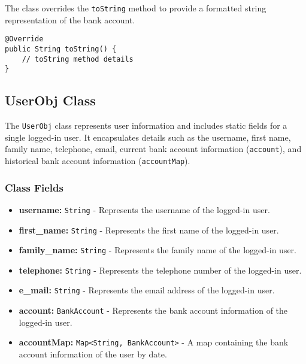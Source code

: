 \documentclass{article}
\begin{document}
The class overrides the \texttt{toString} method to provide a formatted string representation of the bank account.

\begin{verbatim}
@Override
public String toString() {
    // toString method details
}
\end{verbatim}

\subsection{UserObj Class}\label{user-obj}

The \texttt{UserObj} class represents user information and includes static fields for a single logged-in user. It encapsulates details such as the username, first name, family name, telephone, email, current bank account information (\texttt{account}), and historical bank account information (\texttt{accountMap}).

\subsubsection{Class Fields}

\begin{itemize}
    \item \textbf{username:} \texttt{String} - Represents the username of the logged-in user.
    
    \item \textbf{first\_name:} \texttt{String} - Represents the first name of the logged-in user.
    
    \item \textbf{family\_name:} \texttt{String} - Represents the family name of the logged-in user.
    
    \item \textbf{telephone:} \texttt{String} - Represents the telephone number of the logged-in user.
    
    \item \textbf{e\_mail:} \texttt{String} - Represents the email address of the logged-in user.
    
    \item \textbf{account:} \texttt{BankAccount} - Represents the bank account information of the logged-in user.
    
    \item \textbf{accountMap:} \texttt{Map<String, BankAccount>} - A map containing the bank account information of the user by date.
\end{itemize}
\end{document}
